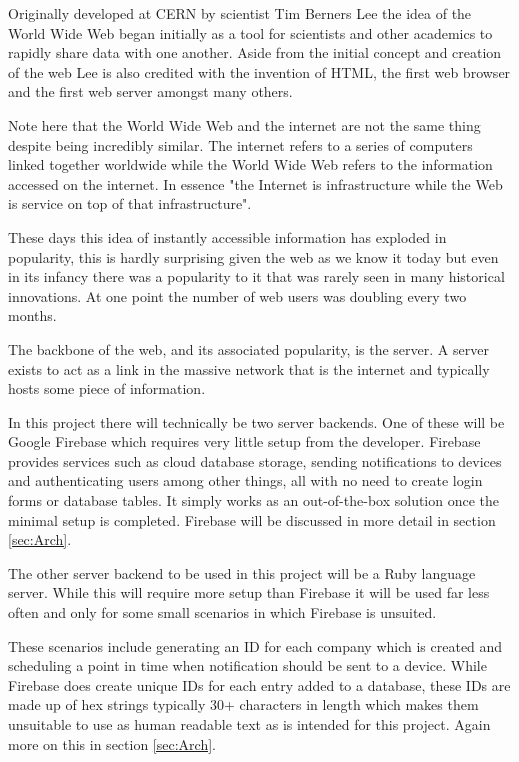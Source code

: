 Originally developed at CERN by scientist Tim Berners Lee\cite{restapidesigntimebernersleereference} the idea of the World Wide Web began initially as a tool for scientists and other academics to rapidly share data with one another\cite{cernwebbirth}. Aside from the initial concept and creation of the web Lee is also credited with the invention of HTML, the first web browser and the first web server amongst many others\cite{restapidesigntimebernersleereference}.

Note here that the World Wide Web and the internet are not the same thing despite being incredibly similar. The internet refers to a series of computers linked together worldwide while the World Wide Web refers to the information accessed on the internet. In essence "the Internet is infrastructure while the Web is service on top of that infrastructure"\cite{webinternetdifference}.

These days this idea of instantly accessible information has exploded in popularity, this is hardly surprising given the web as we know it today but even in its infancy there was a popularity to it that was rarely seen in many historical innovations. At one point the number of web users was doubling every two months\cite{restapidesignwebusersreference}. 

The backbone of the web, and its associated popularity, is the server. A server exists to act as a link in the massive network that is the internet and typically hosts some piece of information.

In this project there will technically be two server backends. One of these will be Google Firebase which requires very little setup from the developer. Firebase provides services such as cloud database storage, sending notifications to devices and authenticating users among other things, all with no need to create login forms or database tables. It simply works as an out-of-the-box solution once the minimal setup is completed. Firebase will be discussed in more detail in section \ref{sec:Arch}.

The other server backend to be used in this project will be a Ruby language server. While this will require more setup than Firebase it will be used far less often and only for some small scenarios in which Firebase is unsuited. 

These scenarios include generating an ID for each company which is created and scheduling a point in time when notification should be sent to a device. While Firebase does create unique IDs for each entry added to a database, these IDs are made up of hex strings typically 30+ characters in length which makes them unsuitable to use as human readable text as is intended for this project. Again more on this in section \ref{sec:Arch}.

